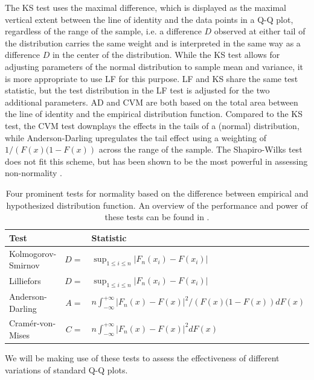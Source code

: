 \documentclass{article}\usepackage[]{graphicx}\usepackage[]{color}
\begin{document}
The KS test uses the maximal  difference, which is displayed as the maximal vertical extent between the line of identity and the data points in a Q-Q plot, regardless of the range of the sample, i.e. a difference $D$ observed at either tail of the distribution carries the same weight and is interpreted in the same way as a difference $D$ in the center of the distribution. While the KS test allows for adjusting parameters of the normal distribution to sample mean and variance, it is more appropriate to use LF for this purpose. LF and KS share the same test statistic, but the test distribution in the LF test is adjusted for the two additional parameters.  AD and CVM  are both based on the total area between the line of identity and the empirical distribution function. Compared to the KS  test,  the CVM test downplays the effects in the tails of a (normal) distribution, while Anderson-Darling upregulates the tail effect using a weighting of $1/\left(F(x)(1 - F(x)\right)$ across the range of the sample. 
The Shapiro-Wilks test does not fit this scheme, but has been shown to be the most powerful in assessing non-normality \citep{stephens:1974, razali:2011}.
\begin{table}
\centering
\begin{tabular}{lrl}\hline
Test && Statistic\\\hline\hline
Kolmogorov-Smirnov & $D =$ & $ \sup_{1 \le i \le n} \left | F_n(x_i) - F(x_i)\right|$ \\
Lilliefors & $D =$ & $ \sup_{1 \le i \le n} \left | F_n(x_i) - F(x_i)\right|$ \\
Anderson-Darling & $A =$ & $ n \int_{-\infty}^{+\infty} \left | F_n(x) - F(x)\right|^2/\left(F(x)(1 - F(x)\right) dF(x)$\\
Cram\'{e}r-von-Mises & $C =$ & $n \int_{-\infty}^{+\infty} \left | F_n(x) - F(x)\right|^2 dF(x)$ \\\hline
\end{tabular}
\caption{\label{tab:tests} Four prominent tests for normality based on the difference between empirical and hypothesized distribution function. An overview of the performance and power of these tests can be found in \citet{stephens:1974}.}
\end{table}
%
We will be making use of these tests to assess the effectiveness of different variations of standard Q-Q plots.
\end{document}
